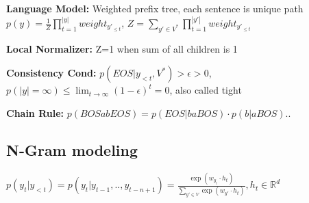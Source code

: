 \textbf{Language Model:} Weighted prefix tree, each sentence is unique path\\
$p(y) = \frac{1}{Z} \prod_{t=1}^{|y|} weight_{y'_{\leq t}}$, 
$Z = \sum_{y' \in V^*} \prod_{t=1}^{|y'|} weight_{y'_{\leq t}}$\\
\begin{comment}
	The sum of the product of the edges of all possible paths.\\
\end{comment} 

\textbf{Local Normalizer:} Z=1 when sum of all children is 1\\
\begin{comment}
	Every nodes has a distribution over edges that come out of that node. This means that the sum of all edges leaving a node is equal to 1.\\
	We must have the condition that every leaf is EOS, e.g. that every path is finite length. Otherwise we could loose probability mass and it is not a distribution anymore.\\
\end{comment} 

\textbf{Consistency Cond:} $p(EOS|y_{<t}, V^*) > \epsilon > 0$,\\
$p(|y| = \infty) \leq \lim_{t\rightarrow \infty} (1- \epsilon)^t = 0$, also called tight\\
\begin{comment}
	In other words, if a language model assigns positive probability to a string of infinite length, it is inconsistent.
	We call a locally normalized language model tight if the normalizer sums to one and does not loose probability mass.\\
\end{comment} 


\textbf{Chain Rule:} $p(BOS a b EOS) = p(EOS | b a BOS) \cdot p(b | a BOS) ..$\\

\subsection{N-Gram modeling}
$p(y_t | y_{<t}) = p(y_t | y_{t-1}, .., y_{t-n+1}) = \frac{\exp (w_{y_t} \cdot h_t)}{\sum_{y' \in V} \exp(w_{y'} \cdot h_t)}, h_t \in \mathbb{R}^d$\\
\begin{comment}
	Idea: ensure a finite history to make modelling easier.\\
	The parameter of the model is w, a word vector, and h is the n-gram context vector, both get learned by backpropagation.\\
	Dot product stands for similarity: Words that are more similar to context vectors get higher probability.\\
\end{comment} 

